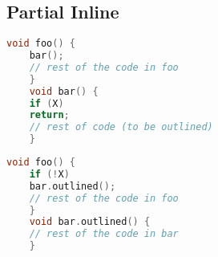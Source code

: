 \subsection{Partial Inline }

\begin{lstlisting}[language=C,frame=single, caption=An ,label = lst:expr2]
  void foo() {
    bar();
    // rest of the code in foo
    }
    void bar() {
    if (X)
    return;
    // rest of code (to be outlined)
    }
\end{lstlisting}


\begin{lstlisting}[language=C,frame=single, caption=An ,label = lst:expr2]
  void foo() {
    if (!X)
    bar.outlined();
    // rest of the code in foo
    }
    void bar.outlined() {
    // rest of the code in bar
    }
\end{lstlisting}